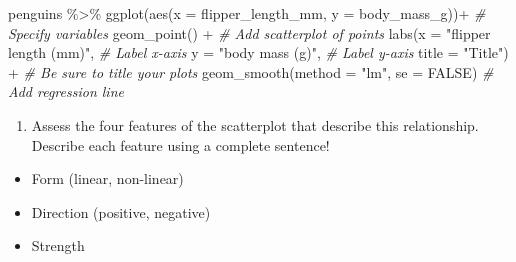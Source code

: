 \documentclass[
]{report}
\newenvironment{Shaded}{\begin{snugshade}}{\end{snugshade}}
\newcommand{\AttributeTok}[1]{\textcolor[rgb]{0.77,0.63,0.00}{#1}}
\newcommand{\CommentTok}[1]{\textcolor[rgb]{0.56,0.35,0.01}{\textit{#1}}}
\newcommand{\ConstantTok}[1]{\textcolor[rgb]{0.00,0.00,0.00}{#1}}
\newcommand{\FunctionTok}[1]{\textcolor[rgb]{0.00,0.00,0.00}{#1}}
\newcommand{\NormalTok}[1]{#1}
\newcommand{\SpecialCharTok}[1]{\textcolor[rgb]{0.00,0.00,0.00}{#1}}
\newcommand{\StringTok}[1]{\textcolor[rgb]{0.31,0.60,0.02}{#1}}
\providecommand{\tightlist}{%
  \setlength{\itemsep}{0pt}\setlength{\parskip}{0pt}}
\begin{document}
\begin{Shaded}
\begin{Highlighting}[]
\NormalTok{penguins }\SpecialCharTok{\%\textgreater{}\%}
  \FunctionTok{ggplot}\NormalTok{(}\FunctionTok{aes}\NormalTok{(}\AttributeTok{x =}\NormalTok{ flipper\_length\_mm, }\AttributeTok{y =}\NormalTok{ body\_mass\_g))}\SpecialCharTok{+}  \CommentTok{\# Specify variables}
  \FunctionTok{geom\_point}\NormalTok{() }\SpecialCharTok{+}  \CommentTok{\# Add scatterplot of points}
  \FunctionTok{labs}\NormalTok{(}\AttributeTok{x =} \StringTok{"flipper length (mm)"}\NormalTok{,  }\CommentTok{\# Label x{-}axis}
       \AttributeTok{y =} \StringTok{"body mass (g)"}\NormalTok{,  }\CommentTok{\# Label y{-}axis}
       \AttributeTok{title =} \StringTok{"Title"}\NormalTok{) }\SpecialCharTok{+} \CommentTok{\# Be sure to title your plots}
  \FunctionTok{geom\_smooth}\NormalTok{(}\AttributeTok{method =} \StringTok{"lm"}\NormalTok{, }\AttributeTok{se =} \ConstantTok{FALSE}\NormalTok{)  }\CommentTok{\# Add regression line}
\end{Highlighting}
\end{Shaded}

\begin{enumerate}
\def\labelenumi{\arabic{enumi}.}
\tightlist
\item
  Assess the four features of the scatterplot that describe this relationship. Describe each feature using a complete sentence!
  \vspace{1mm}
\end{enumerate}

\begin{itemize}
\tightlist
\item
  Form (linear, non-linear)
\end{itemize}

\vspace{.15in}

\begin{itemize}
\tightlist
\item
  Direction (positive, negative)
\end{itemize}

\vspace{.15in}

\begin{itemize}
\tightlist
\item
  Strength
\end{itemize}

\vspace{.15in}
\end{document}
